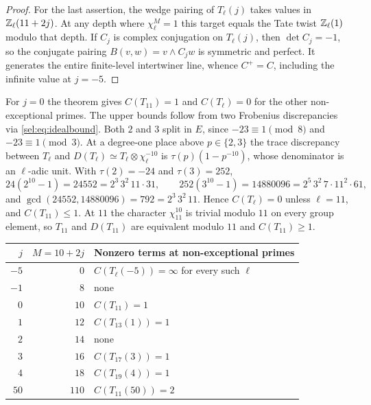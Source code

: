 \begin{proof}
For the last assertion, the wedge pairing of $T_\ell(j)$ takes values in
$\mathbb{Z}_\ell(11+2j)$. At any depth where $\chi_\ell^M=1$ this target equals the
Tate twist $\mathbb{Z}_\ell(1)$ modulo that depth. If $C_j$ is complex conjugation
on $T_\ell(j)$, then $\det C_j=-1$, so the conjugate pairing
$B(v,w)=v\wedge C_jw$ is symmetric and perfect. It generates the entire
finite-level intertwiner line, whence $C^+=C$, including the infinite value
at $j=-5$.
\end{proof}

\begin{example}[Two-prime certificate at $j=0$]\label{sel:ex:twoprime}
For $j=0$ the theorem gives $C(T_{11})=1$ and $C(T_\ell)=0$ for the other
non-exceptional primes. The upper bounds follow from two Frobenius
discrepancies via \eqref{sel:eq:idealbound}. Both $2$ and $3$ split in $E$,
since $-23\equiv1\pmod 8$ and $-23\equiv1\pmod 3$. At a degree-one place
above $p\in\{2,3\}$ the trace discrepancy between $T_\ell$ and
$D(T_\ell)\simeq T_\ell\otimes\chi_\ell^{-10}$ is $\tau(p)(1-p^{-10})$, whose
denominator is an $\ell$-adic unit. With $\tau(2)=-24$ and $\tau(3)=252$,
\[
 24(2^{10}-1)=24552=2^3\,3^2\,11\cdot31,\qquad
 252(3^{10}-1)=14880096=2^5\,3^2\,7\cdot11^2\cdot61,
\]
and $\gcd(24552,14880096)=792=2^3\,3^2\,11$. Hence $C(T_\ell)=0$ unless
$\ell=11$, and $C(T_{11})\le1$. At $11$ the character $\chi_{11}^{10}$ is
trivial modulo $11$ on every group element, so $T_{11}$ and $D(T_{11})$ are
equivalent modulo $11$ and $C(T_{11})\ge1$.
\end{example}

\begin{center}
\begin{tabular}{@{}rrl@{}}
\toprule
$j$ & $M=10+2j$ & Nonzero terms at non-exceptional primes\\
\midrule
$-5$ & $0$ & $C(T_\ell(-5))=\infty$ for every such $\ell$\\
$-1$ & $8$ & none\\
$0$ & $10$ & $C(T_{11})=1$\\
$1$ & $12$ & $C(T_{13}(1))=1$\\
$2$ & $14$ & none\\
$3$ & $16$ & $C(T_{17}(3))=1$\\
$4$ & $18$ & $C(T_{19}(4))=1$\\
$50$ & $110$ & $C(T_{11}(50))=2$\\
\bottomrule
\end{tabular}
\end{center}

